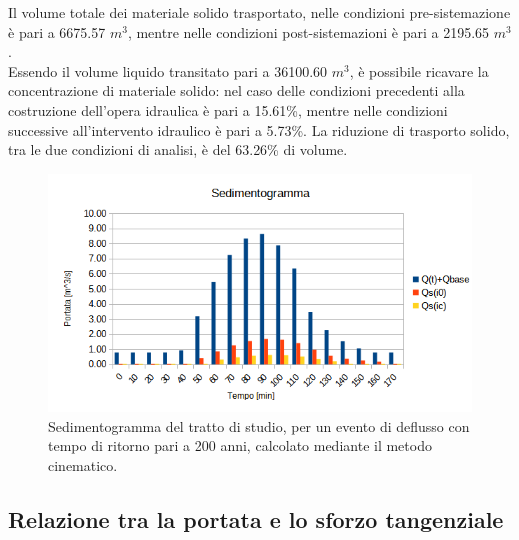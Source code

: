 Il volume totale dei materiale solido trasportato, nelle condizioni pre-sistemazione è pari a 6675.57 $m^3$, mentre nelle condizioni post-sistemazioni è pari a 2195.65 $m^3$.\\
Essendo il volume liquido transitato pari a 36100.60 $m^3$, è possibile ricavare la concentrazione di materiale solido: nel caso delle condizioni precedenti alla costruzione dell'opera idraulica è pari a 15.61\%, mentre nelle condizioni successive all'intervento idraulico è pari a 5.73\%. La riduzione di trasporto solido, tra le due condizioni di analisi, è del 63.26\% di volume.

\begin{figure}[H] \centering
    \includegraphics[scale=0.75]{immagini/sedimentogramma.png}
    \caption{Sedimentogramma del tratto di studio, per un evento di deflusso con tempo di ritorno pari a 200 anni, calcolato mediante il metodo cinematico.}
    \label{sedimentogramma}
\end{figure}

\subsection{Relazione tra la portata e lo sforzo tangenziale}